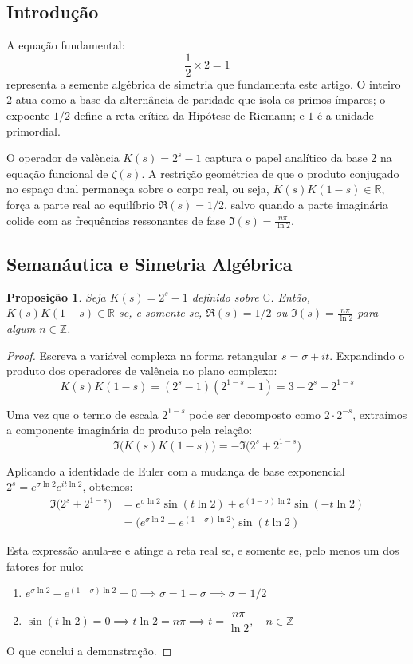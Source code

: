 \documentclass[12pt,a4paper]{article}
\theoremstyle{plain}
\newtheorem{proposition}[theorem]{Proposição}
\begin{document}
\subsection{Introdução}

A equação fundamental:
\[
\frac{1}{2} \times 2 = 1
\]
representa a semente algébrica de simetria que fundamenta este artigo.
O inteiro $2$ atua como a base da alternância de paridade que isola os
primos ímpares; o expoente $1/2$ define a reta crítica da Hipótese de
Riemann; e $1$ é a unidade primordial.

O operador de valência $K(s) = 2^s - 1$ captura o papel analítico da
base 2 na equação funcional de $\zeta(s)$.  A restrição geométrica de
que o produto conjugado no espaço dual permaneça sobre o corpo real, ou
seja, $K(s)K(1-s) \in \mathbb{R}$, força a parte real ao equilíbrio
$\mathfrak{R}(s) = 1/2$, salvo quando a parte imaginária colide com as
frequências ressonantes de fase $\mathfrak{I}(s) = \frac{n\pi}{\ln 2}$.

\subsection{Semanáutica e Simetria Algébrica}

\begin{proposition}
Seja $K(s) = 2^s - 1$ definido sobre $\mathbb{C}$.  Então,
$K(s)K(1-s) \in \mathbb{R}$ se, e somente se,
$\mathfrak{R}(s) = 1/2$ ou
$\mathfrak{I}(s) = \frac{n\pi}{\ln 2}$ para algum $n \in \mathbb{Z}$.
\end{proposition}

\begin{proof}
Escreva a variável complexa na forma retangular $s = \sigma + it$.
Expandindo o produto dos operadores de valência no plano complexo:
\[
K(s)K(1-s) = (2^s - 1)(2^{1-s} - 1) = 3 - 2^s - 2^{1-s}
\]

Uma vez que o termo de escala $2^{1-s}$ pode ser decomposto como
$2 \cdot 2^{-s}$, extraímos a componente imaginária do produto pela
relação:
\[
\mathfrak{I}\bigl(K(s)K(1-s)\bigr) = -\mathfrak{I}\bigl(2^s + 2^{1-s}\bigr)
\]

Aplicando a identidade de Euler com a mudança de base exponencial
$2^s = e^{\sigma \ln 2} e^{i t \ln 2}$, obtemos:
\begin{align*}
\mathfrak{I}\bigl(2^s + 2^{1-s}\bigr)
&= e^{\sigma \ln 2} \sin(t \ln 2) + e^{(1-\sigma) \ln 2} \sin(-t \ln 2) \\
&= \bigl( e^{\sigma \ln 2} - e^{(1-\sigma) \ln 2} \bigr) \sin(t \ln 2)
\end{align*}

Esta expressão anula-se e atinge a reta real se, e somente se, pelo
menos um dos fatores for nulo:
\begin{enumerate}
    \item $e^{\sigma \ln 2} - e^{(1-\sigma) \ln 2} = 0 \implies
      \sigma = 1 - \sigma \implies \sigma = 1/2$
    \item $\sin(t \ln 2) = 0 \implies t \ln 2 = n\pi \implies
      t = \dfrac{n\pi}{\ln 2},\quad n \in \mathbb{Z}$
\end{enumerate}
O que conclui a demonstração.
\end{proof}
\end{document}
